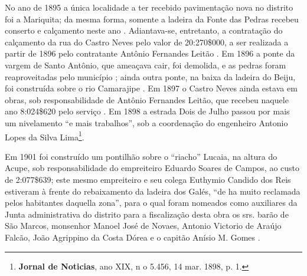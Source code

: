 No ano de 1895 a única localidade a ter recebido pavimentação nova no distrito foi a Mariquita; da mesma forma, somente a ladeira da Fonte das
Pedras recebeu conserto e calçamento neste ano \cite[p.~16]{salvador_relatorio_1895}. Adiantava-se, entretanto, a contratação do calçamento da rua do Castro Neves pelo valor de 20:270\$000, a ser realizada a partir de 1896 pelo contratante Antônio Fernandes Leitão \cite[p.~23]{salvador_relatorio_1895}. Em 1896 a ponte da vargem de Santo Antônio, que ameaçava cair, foi demolida, e as pedras foram reaproveitadas pelo município \cite[p.~137]{salvador_relatorio_1895}; ainda outra ponte, na baixa da ladeira do Beiju, foi construída sobre o rio Camarajipe \cite[p.~156]{salvador_relatorio_1894}. Em 1897 o Castro Neves ainda estava em obras, sob responsabilidade de Antônio Fernandes Leitão, que recebeu naquele ano 8:024\$620 pelo serviço \cite[p.~99]{salvador_relatorio_1897}. Em 1898 a estrada Dois de Julho passou por mais um nivelamento ``e mais trabalhos'', sob a coordenação do engenheiro Antonio Lopes da Silva Lima\footnote{\textbf{Jornal de Noticias}, ano XIX, n o 5.456, 14 mar. 1898, p. 1.}.

Em 1901 foi construído um pontilhão sobre o ``riacho'' Lucaia, na altura do Acupe, sob responsabilidade do empreiteiro Eduardo Soares de Campos, ao custo de 2:077\$639; este mesmo empreiteiro e seu colega Euthymio Candido dos Reis estiveram à frente do rebaixamento da ladeira dos Galés, ``de ha muito reclamada pelos habitantes daquella zona'', para o qual foram nomeados como auxiliares da Junta administrativa do distrito para a fiscalização desta obra os srs. barão de São Marcos, monsenhor Manoel José de Novaes, Antonio Victorio de Araújo Falcão, João Agrippino da Costa Dórea e o capitão Anísio M. Gomes \cite[pp.~15, 162, 249-250]{salvador_relatorio_1901}.

